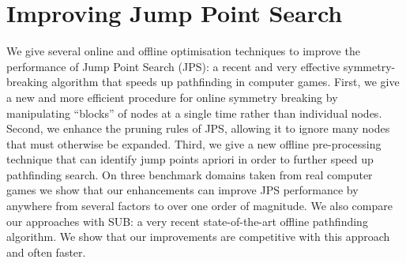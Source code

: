\chapter{Improving Jump Point Search}
\label{cha::jps2}
We give several online and offline optimisation techniques to improve the
performance of Jump Point Search (JPS): a recent and very effective
symmetry-breaking algorithm that speeds up pathfinding in computer games.
First, we give a new and more efficient procedure for online symmetry breaking
by manipulating ``blocks'' of nodes at a single time rather than individual
nodes. Second, we enhance the pruning rules of JPS, allowing it to ignore many
nodes that must otherwise be expanded. Third, we give a new offline
pre-processing technique that can identify jump points apriori in order to
further speed up pathfinding search. On three benchmark domains taken from
real computer games we show that our  enhancements can improve JPS performance
by anywhere from several factors  to over one order of magnitude. We also
compare our approaches with SUB: a very recent state-of-the-art offline
pathfinding algorithm. We show that our improvements are competitive with this
approach and often faster.

\newpage
